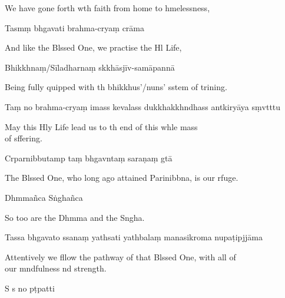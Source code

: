 \begin{english}
  We have gone forth wth faith from home to hmelessness,
\end{english}

Tasmṃ bhgavati brahma-cryaṃ crāma

\begin{english}
  And like the Blssed One, we practise the Hl Life,
\end{english}

Bhikkhnaṃ/Sīladharnaṃ skkhāsjīv-samāpannā

\begin{english}
  Being fully quipped with th bhikkhus'/nuns' sstem of trining.
\end{english}

Taṃ no brahma-cryaṃ imass kevalass dukkhakkhndhass antkiryāya sṃvtttu

\begin{english}
  May this Hly Life lead us to th end of this whle mass \\of sffering.
\end{english}


Crparnibbutamp taṃ bhgavntaṃ saraṇaṃ gtā

\begin{english}
  The Blssed One, who long ago attained Parinibbna, is our rfuge.
\end{english}

Dhmmañca Sṅghañca

\begin{english}
  So too are the Dhmma and the Sngha.
\end{english}

Tassa bhgavato ssanaṃ yathsati yathbalaṃ manasikroma nupaṭipjjāma

\begin{english}
  Attentively we fllow the pathway of that Blssed One, with all of \\our mndfulness nd strength.
\end{english}

S s no pṭpatti

